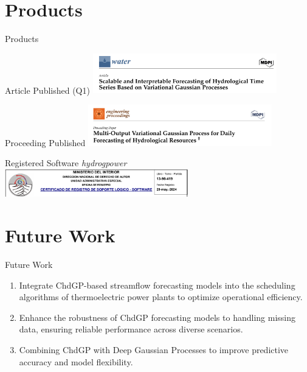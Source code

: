 \documentclass[10pt, xcolor=table]{beamer}
\let\olditem\item
\renewcommand\item{\olditem\justifying}
\begin{document}
\section*{Products}
\begin{frame}{Products}
	\begin{block}{Article Published (Q1)}
		\centering
		\includegraphics[width=0.6\textwidth]{images/article.png}
	\end{block}
	
	\begin{block}{Proceeding Published}
		\centering
		\includegraphics[width=0.6\textwidth]{images/proceeding.png}
	\end{block}

	\begin{block}{Registered Software \textit{hydrogpower}}
		\centering
		\includegraphics[width=0.6\textwidth]{images/software.png}
	\end{block}
	
\end{frame}

\section*{Future Work}
\begin{frame}{Future Work}
	\begin{enumerate}
		\item Integrate ChdGP-based streamflow forecasting models into the scheduling algorithms of thermoelectric power plants to optimize operational efficiency.
		
		\item Enhance the robustness of ChdGP forecasting models to handling missing data, ensuring reliable performance across diverse scenarios.
		
		\item Combining ChdGP with Deep Gaussian Processes to improve predictive accuracy and model flexibility.
	\end{enumerate}
\end{frame}
\end{document}
